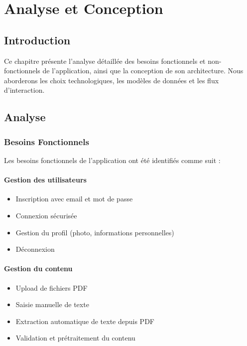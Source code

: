 \documentclass[12pt,a4paper]{report}
\begin{document}
\chapter{Analyse et Conception}

\section{Introduction}

Ce chapitre présente l'analyse détaillée des besoins fonctionnels et non-fonctionnels de l'application, ainsi que la conception de son architecture. Nous aborderons les choix technologiques, les modèles de données et les flux d'interaction.

\section{Analyse}

\subsection{Besoins Fonctionnels}

Les besoins fonctionnels de l'application ont été identifiés comme suit :

\subsubsection{Gestion des utilisateurs}
\begin{itemize}
    \item Inscription avec email et mot de passe
    \item Connexion sécurisée
    \item Gestion du profil (photo, informations personnelles)
    \item Déconnexion
\end{itemize}

\subsubsection{Gestion du contenu}
\begin{itemize}
    \item Upload de fichiers PDF
    \item Saisie manuelle de texte
    \item Extraction automatique de texte depuis PDF
    \item Validation et prétraitement du contenu
\end{itemize}
\end{document}
